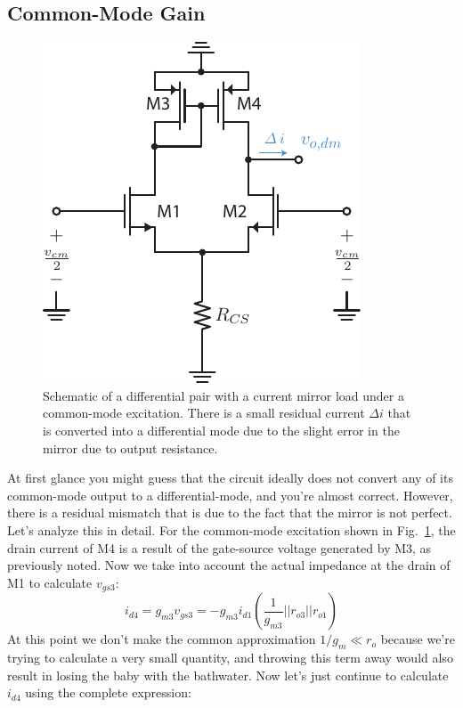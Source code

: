 \subsection{Common-Mode Gain}
\begin{figure}[tb]
\centering
\includegraphics[scale=1]{Diffpair_se_cmgain.pdf}
\caption{Schematic of a differential pair with a current mirror load under a common-mode excitation.  There is a small residual current $\Delta i$ that is converted into a differential mode due to the slight error in the mirror due to output resistance.}
\label{fig:Diffpair_se_cmgain.pdf}
\end{figure}
At first glance you might guess that the circuit ideally does not convert any of its common-mode output to a differential-mode, and you're almost correct.  However, there is a residual mismatch that is due to the fact that the mirror is not perfect.  Let's analyze this in detail.
For the common-mode excitation shown in Fig.~\ref{fig:Diffpair_se_cmgain.pdf}, the drain current of M4 is a result of the gate-source voltage generated by M3, as previously noted.  Now we take into account the actual impedance at the drain of M1 to calculate $v_{gs3}$:
    \begin{equation}
        i_{d4} = g_{m3} v_{gs3} = -g_{m3} i_{d1} \left( \frac{1}{g_{m3}} || r_{o3} || r_{o1} \right) 
    \end{equation}
At this point we don't make the common approximation $1/g_m \ll r_o$ because we're trying to calculate a very small quantity, and throwing this term away would also result in losing the baby with the bathwater.  Now let's just continue to calculate $i_{d4}$ using the complete expression:
